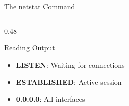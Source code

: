 \documentclass[aspectratio=169, 11pt]{beamer}
\begin{document}
\begin{frame}{The netstat Command}
\begin{columns}[T]
\begin{column}{0.48\textwidth}
            \vspace{0.2em}
            \begin{exampleblock}{Reading Output}
                \small
                \begin{itemize}\setlength{\itemsep}{1pt}
                    \item \textbf{LISTEN}: Waiting for connections
                    \item \textbf{ESTABLISHED}: Active session
                    \item \textbf{0.0.0.0}: All interfaces
                \end{itemize}
            \end{exampleblock}
        \end{column}
    \end{columns}
\end{frame}
\end{document}
